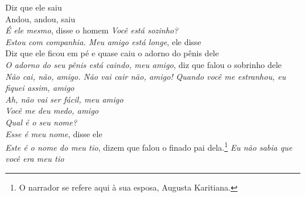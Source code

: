 \bigskip

\begin{linenumbers}\begingroup\raggedright
 
\noindent   Diz que ele saiu\\
  Andou, andou, saiu\\
  \textit{É ele mesmo}, disse o homem \textit{Você está sozinho?}\\
  \textit{Estou com companhia. Meu amigo está longe}, ele disse\\
  Diz que ele ficou em pé e quase caiu o adorno do pênis dele\\
  \textit{O adorno do seu pênis está caindo, meu amigo}, diz que falou o sobrinho dele\\
  \textit{Não cai, não, amigo. Não vai cair não, amigo! Quando você me
 estranhou, eu fiquei assim, amigo}\\
  \textit{Ah, não vai ser fácil, meu amigo}\\
  \textit{Você me deu medo, amigo}\\
  \textit{Qual é o seu nome?}\\
  \textit{Esse é meu nome}, disse ele\\
  \textit{Este é o nome do meu tio}, dizem que falou o finado pai
 dela.\footnote{O narrador se refere aqui à sua esposa, Augusta Karitiana.}
 \textit{Eu não sabia que você era meu tio}
 
\end{linenumbers}\endgroup

\bigskip

